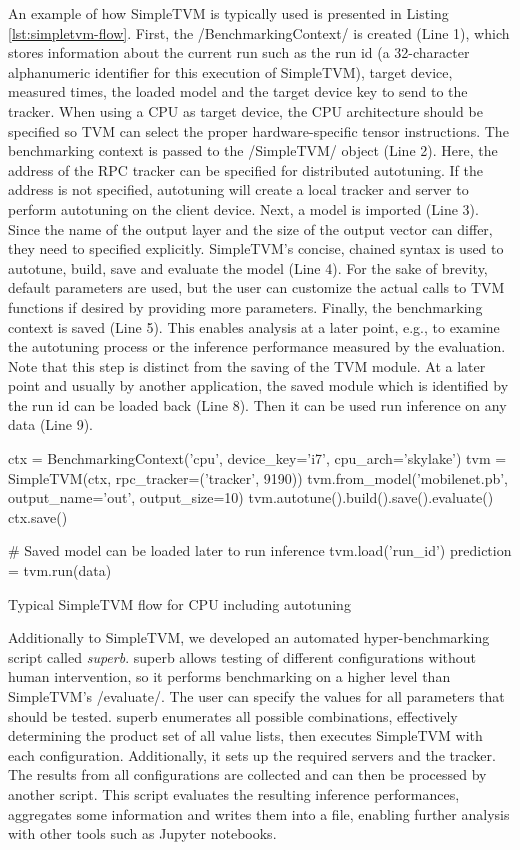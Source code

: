 An example of how SimpleTVM is typically used is presented in Listing \ref{lst:simpletvm-flow}. First, the \pythoninline/BenchmarkingContext/ is created (Line 1), which stores information about the current run such as the run id (a 32-character alphanumeric identifier for this execution of SimpleTVM), target device, measured times, the loaded model and the target device key to send to the tracker. When using a CPU as target device, the CPU architecture should be specified so TVM can select the proper hardware-specific tensor instructions. The benchmarking context is passed to the \pythoninline/SimpleTVM/ object (Line 2). Here, the address of the RPC tracker can be specified for distributed autotuning. If the address is not specified, autotuning will create a local tracker and server to perform autotuning on the client device. Next, a model is imported (Line 3). Since the name of the output layer and the size of the output vector can differ, they need to specified explicitly. SimpleTVM's concise, chained syntax is used to autotune, build, save and evaluate the model (Line 4). For the sake of brevity, default parameters are used, but the user can customize the actual calls to TVM functions if desired by providing more parameters. Finally, the benchmarking context is saved (Line 5). This enables analysis at a later point, e.g., to examine the autotuning process or the inference performance measured by the evaluation. Note that this step is distinct from the saving of the TVM module. At a later point and usually by another application, the saved module which is identified by the run id can be loaded back (Line 8). Then it can be used run inference on any data  (Line 9).

\begin{listing}
\begin{pythoncode}
ctx = BenchmarkingContext('cpu', device_key='i7', cpu_arch='skylake')
tvm = SimpleTVM(ctx, rpc_tracker=('tracker', 9190))
tvm.from_model('mobilenet.pb', output_name='out', output_size=10)
tvm.autotune().build().save().evaluate()
ctx.save()

# Saved model can be loaded later to run inference
tvm.load('run_id')
prediction = tvm.run(data)
\end{pythoncode}
\unskip
\caption{Typical SimpleTVM flow for CPU including autotuning}
\label{lst:simpletvm-flow}
\end{listing}

Additionally to SimpleTVM, we developed an automated hyper-benchmarking script called \textit{superb}. superb allows testing of different configurations without human intervention, so it performs benchmarking on a higher level than SimpleTVM's \pythoninline/evaluate/. The user can specify the values for all parameters that should be tested. superb enumerates all possible combinations, effectively determining the product set of all value lists, then executes SimpleTVM with each configuration. Additionally, it sets up the required servers and the tracker. The results from all configurations are collected and can then be processed by another script. This script evaluates the resulting inference performances, aggregates some information and writes them into a file, enabling further analysis with other tools such as Jupyter notebooks.

